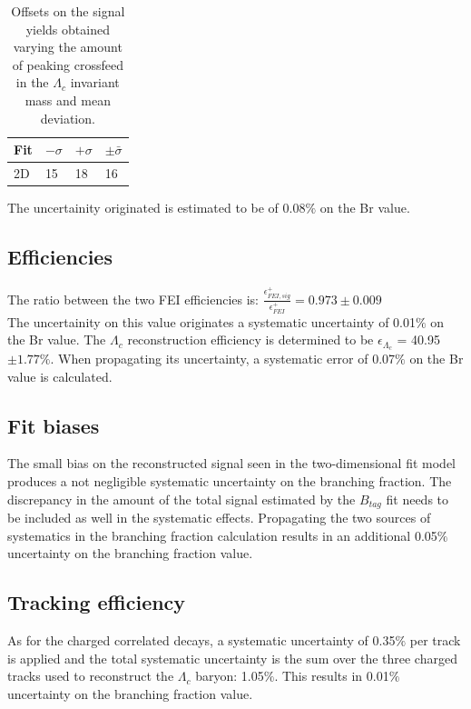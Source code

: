 \vspace{0.25 cm}
\begin{table}[H]
\begin{tabular}{ |p{2.5cm}||p{2cm}| p{2cm}|  p{2cm}|}
\hline
    Fit    &  $- \sigma$ &  $+ \sigma$ & $ \pm \bar{\sigma}$\\
 \hline
 2D        &     15  & 18  & 16 \\
  \hline
\end{tabular}
\caption{Offsets on the signal yields obtained varying the amount of peaking crossfeed in the $\Lambda_c$ invariant mass and mean deviation.}
\end{table}
 \vspace{0.25 cm}

The uncertainity originated is estimated to be of 0.08$\%$ on the Br value. 

\subsection{Efficiencies}\label{sec:charged_anticorrLam}
 
The ratio between the two FEI efficiencies is: 
 $\frac{\epsilon^{+}_{FEI,  sig}}{\epsilon^{+}_{FEI}} = 0.973 \pm 0.009 $ \\
 The uncertainity on this value originates a systematic uncertainty of 0.01$\%$ on the Br value.
The $\Lambda_c$ reconstruction efficiency is determined to be $\epsilon_{\Lambda_c}$ = 40.95 $\pm 1.77 \%$. When propagating its uncertainty, a systematic error of 0.07$\%$ on the Br value is calculated.

\subsection{Fit biases}

The small bias on the reconstructed signal seen in the two-dimensional fit model produces a not negligible systematic uncertainty on the branching fraction.  The discrepancy in the amount of the total signal estimated by the $B_{tag}$ fit needs to be included as well in the systematic effects.
Propagating the two sources of systematics in the branching fraction calculation results in an additional 0.05$\%$ uncertainty on the branching fraction value.


\subsection{Tracking efficiency}
As for the charged correlated decays, a systematic uncertainty of 0.35$\%$ per track is applied and the total systematic uncertainty is the sum over the 
three charged tracks used to reconstruct the $\Lambda_c$ baryon: 1.05$\%$.
This results in 0.01$\%$ uncertainty on the branching fraction value. 

